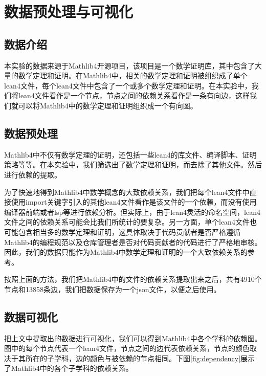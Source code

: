 \section{数据预处理与可视化}

\subsection{数据介绍}

本实验的数据来源于Mathlib4开源项目\cite{mathlib4}，该项目是一个数学证明库，其中包含了大量的数学定理和证明。在Mathlib4中，相关的数学定理和证明被组织成了单个lean4文件，每个lean4文件中包含了一个或多个数学定理和证明。在本实验中，我们将lean4文件看作是一个节点，节点之间的依赖关系看作是一条有向边，这样我们就可以将Mathlib4中的数学定理和证明组织成一个有向图。

\subsection{数据预处理}

Mathlib4中不仅有数学定理的证明，还包括一些lean4的库文件、编译脚本、证明策略等等。在本实验中，我们筛选出了数学定理和证明，而去除了其他文件。然后进行依赖的提取。

为了快速地得到Mathlib4中数学概念的大致依赖关系，我们把每个lean4文件中直接使用import关键字引入的其他lean4文件看作是该文件的一个依赖，而没有使用编译器前端或者lsp等进行依赖分析。但实际上，由于lean4灵活的命名空间，lean4文件之间的依赖关系可能会比我们所统计的要复杂。另一方面，单个lean4文件也可能包含相当多的数学定理和证明，这具体取决于代码贡献者是否严格遵循Mathlib4的编程规范以及仓库管理者是否对代码贡献者的代码进行了严格地审核。因此，我们的数据只能作为Mathlib4中数学定理和证明的一个大致依赖关系的参考。

按照上面的方法，我们把Mathlib4中的文件的依赖关系提取出来之后，共有4910个节点和13858条边，我们把数据保存为一个json文件，以便之后使用。

\subsection{数据可视化}

把上文中提取出的数据进行可视化，我们可以得到Mathlib4中各个学科的依赖图。图中的每个节点代表一个lean4文件，节点之间的边代表依赖关系，节点的颜色取决于其所在的子学科，边的颜色与被依赖的节点相同。下图\ref{fig:dependency}展示了Mathlib4中的各个子学科的依赖关系。

